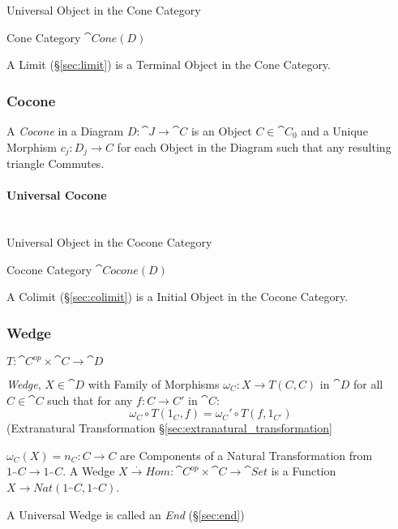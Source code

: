 Universal Object in the Cone Category

Cone Category $\cat{Cone}(D)$

A Limit (\S\ref{sec:limit}) is a Terminal Object in the Cone
Category.



\subsubsection{Cocone}\label{sec:cocone}

A \emph{Cocone} in a Diagram $D : \cat{J} \rightarrow \cat{C}$
is an Object $C \in \cat{C}_0$ and a Unique Morphism $c_j : D_j
\rightarrow C$ for each Object in the Diagram such that any resulting
triangle Commutes.




\paragraph{Universal Cocone}\label{sec:universal_cocone}
\hfill \\

Universal Object in the Cocone Category

Cocone Category $\cat{Cocone}(D)$

A Colimit (\S\ref{sec:colimit}) is a Initial Object in the Cocone
Category.



\subsubsection{Wedge}\label{sec:wedge}

$T : \cat{C}^{op} \times \cat{C} \rightarrow \cat{D}$

\emph{Wedge}, $X \in \cat{D}$ with Family of Morphisms $\omega_C :
X \rightarrow T(C,C)$ in $\cat{D}$ for all $C \in \cat{C}$ such
that for any $f : C \rightarrow C'$ in $\cat{C}$:
\[
  \omega_C \circ T(1_C,f) = \omega_C' \circ T(f,1_{C'})
\]
(Extranatural Transformation \S\ref{sec:extranatural_transformation}

$\omega_C(X) = n_C : C \rightarrow C$ are Components of a Natural
Transformation from $1_\cat{C} \rightarrow 1_\cat{C}$. A Wedge
$X \xrightarrow{.} Hom : \cat{C}^{op} \times \cat{C} \rightarrow
\cat{Set}$ is a Function $X \rightarrow Nat
(1_\cat{C},1_\cat{C})$.

A Universal Wedge is called an \emph{End} (\S\ref{sec:end})



